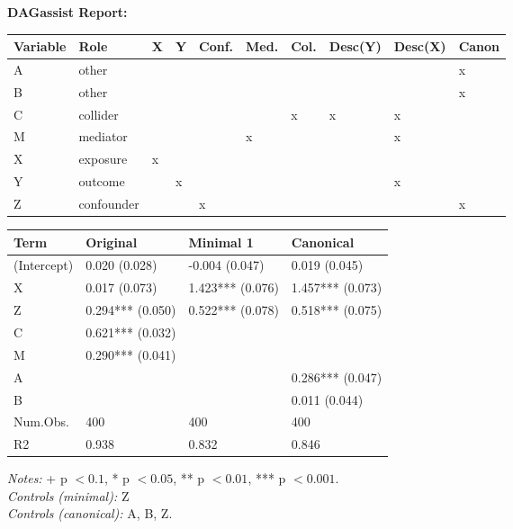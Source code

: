 \begingroup\footnotesize
\setlength{\LTleft}{0pt}\setlength{\LTright}{0pt}
\setlength{\tabcolsep}{4pt}
\renewcommand{\arraystretch}{0.95}
\setlength{\aboverulesep}{0pt}\setlength{\belowrulesep}{0pt}
\setlength{\LTpre}{0pt}\setlength{\LTpost}{0pt}
\begin{center}\textbf{DAGassist Report:}\end{center}
\begin{center}
\begin{longtable}{@{}l l l l l l l l l l@{}}
\toprule
Variable & Role & X & Y & Conf. & Med. & Col. & Desc(Y) & Desc(X) & Canon \\
\midrule
A & other &  &  &  &  &  &  &  & x \\
B & other &  &  &  &  &  &  &  & x \\
C & collider &  &  &  &  & x & x & x &  \\
M & mediator &  &  &  & x &  &  & x &  \\
X & exposure & x &  &  &  &  &  &  &  \\
Y & outcome &  & x &  &  &  &  & x &  \\
Z & confounder &  &  & x &  &  &  &  & x \\
\bottomrule
\end{longtable}
\vspace{1pt}
\begingroup\renewcommand{\arraystretch}{1.08}
\begin{longtable}{@{}l l l l@{}}
\toprule
Term & Original & Minimal 1 & Canonical \\
\midrule
\textnormal{(Intercept)} & 0.020 (0.028) & -0.004 (0.047) & 0.019 (0.045) \\
\textnormal{X} & 0.017 (0.073) & 1.423*** (0.076) & 1.457*** (0.073) \\
\textnormal{Z} & 0.294*** (0.050) & 0.522*** (0.078) & 0.518*** (0.075) \\
\textnormal{C} & 0.621*** (0.032) &  &  \\
\textnormal{M} & 0.290*** (0.041) &  &  \\
\textnormal{A} &  &  & 0.286*** (0.047) \\
\textnormal{B} &  &  & 0.011 (0.044) \\
\textnormal{Num.Obs.} & 400 & 400 & 400 \\
\textnormal{R2} & 0.938 & 0.832 & 0.846 \\
\bottomrule
\end{longtable}
\endgroup
\end{center}
{\footnotesize \emph{Notes:} + p $< 0.1$, * p $< 0.05$, ** p $< 0.01$, *** p $< 0.001$.\\
\hspace*{1.5em}\textit{Controls (minimal):} {Z}\\
\hspace*{1.5em}\textit{Controls (canonical):} {A, B, Z}.}
\endgroup
